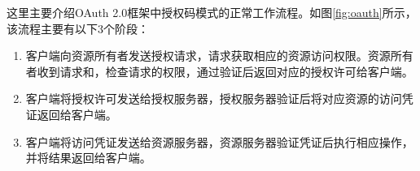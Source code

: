 这里主要介绍OAuth 2.0框架中授权码模式的正常工作流程。如图\ref{fig:oauth}所示，该流程主要有以下3个阶段：

\begin{enumerate}
	\item 客户端向资源所有者发送授权请求，请求获取相应的资源访问权限。资源所有者收到请求和，检查请求的权限，通过验证后返回对应的授权许可给客户端。
	\item 客户端将授权许可发送给授权服务器，授权服务器验证后将对应资源的访问凭证返回给客户端。
	\item 客户端将访问凭证发送给资源服务器，资源服务器验证凭证后执行相应操作，并将结果返回给客户端。
\end{enumerate}

